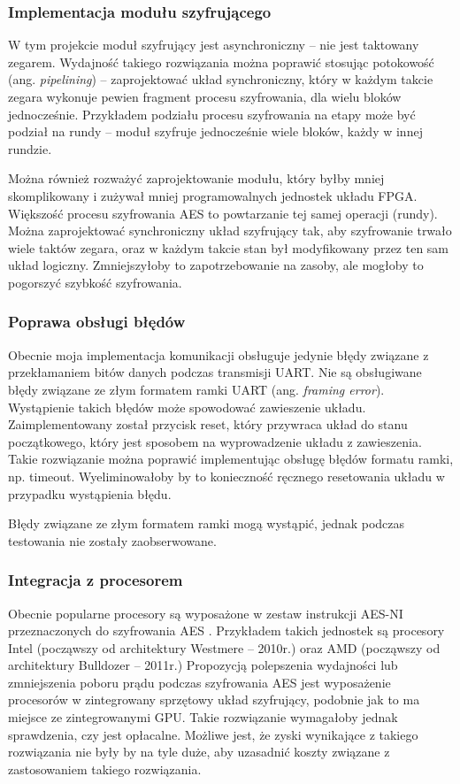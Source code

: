 \subsubsection{Implementacja modułu szyfrującego}
W tym projekcie moduł szyfrujący jest asynchroniczny -- nie jest taktowany zegarem. Wydajność takiego rozwiązania można poprawić stosując potokowość (ang. \textit{pipelining}) -- zaprojektować układ synchroniczny, który w każdym takcie zegara wykonuje pewien fragment procesu szyfrowania, dla wielu bloków jednocześnie. Przykładem podziału procesu szyfrowania na etapy może być podział na rundy -- moduł szyfruje jednocześnie wiele bloków, każdy w innej rundzie.

Można również rozważyć zaprojektowanie modułu, który byłby mniej skomplikowany i zużywał mniej programowalnych jednostek układu FPGA. Większość procesu szyfrowania AES to powtarzanie tej samej operacji (rundy). Można zaprojektować synchroniczny układ szyfrujący tak, aby szyfrowanie trwało wiele taktów zegara, oraz w każdym takcie stan był modyfikowany przez ten sam układ logiczny. Zmniejszyłoby to zapotrzebowanie na zasoby, ale mogłoby to pogorszyć szybkość szyfrowania.

\subsubsection{Poprawa obsługi błędów}
Obecnie moja implementacja komunikacji obsługuje jedynie błędy związane z przekłamaniem bitów danych podczas transmisji UART. Nie są obsługiwane błędy związane ze złym formatem ramki UART (ang. \textit{framing error}). Wystąpienie takich błędów może spowodować zawieszenie układu. Zaimplementowany został przycisk reset, który przywraca układ do stanu początkowego, który jest sposobem na wyprowadzenie układu z zawieszenia. Takie rozwiązanie można poprawić implementując obsługę błędów formatu ramki, np. timeout. Wyeliminowałoby by to konieczność ręcznego resetowania układu w przypadku wystąpienia błędu.

Błędy związane ze złym formatem ramki mogą wystąpić, jednak podczas testowania nie zostały zaobserwowane.

\subsubsection{Integracja z procesorem}
Obecnie popularne procesory są wyposażone w zestaw instrukcji AES-NI przeznaczonych do szyfrowania AES \cite{aes-processors}. Przykładem takich jednostek są procesory Intel (począwszy od architektury Westmere -- 2010r.) oraz AMD (począwszy od architektury Bulldozer -- 2011r.) Propozycją polepszenia wydajności lub zmniejszenia poboru prądu podczas szyfrowania AES jest wyposażenie procesorów w zintegrowany sprzętowy układ szyfrujący, podobnie jak to ma miejsce ze zintegrowanymi GPU. Takie rozwiązanie wymagałoby jednak sprawdzenia, czy jest opłacalne. Możliwe jest, że zyski wynikające z takiego rozwiązania nie były by na tyle duże, aby uzasadnić koszty związane z zastosowaniem takiego rozwiązania.

